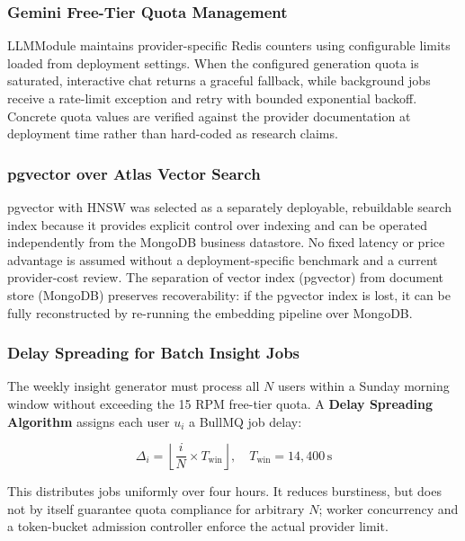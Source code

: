 \documentclass[conference]{IEEEtran}
\begin{document}
\subsubsection{Gemini Free-Tier Quota Management}

LLMModule maintains provider-specific Redis counters using configurable limits loaded from deployment settings. When the configured generation quota is saturated, interactive chat returns a graceful fallback, while background jobs receive a rate-limit exception and retry with bounded exponential backoff. Concrete quota values are verified against the provider documentation at deployment time rather than hard-coded as research claims.

\subsubsection{pgvector over Atlas Vector Search}

pgvector with HNSW was selected as a separately deployable, rebuildable search index because it provides explicit control over indexing and can be operated independently from the MongoDB business datastore. No fixed latency or price advantage is assumed without a deployment-specific benchmark and a current provider-cost review. The separation of vector index (pgvector) from document store (MongoDB) preserves recoverability: if the
pgvector index is lost, it can be fully reconstructed by
re-running the embedding pipeline over MongoDB.

\subsubsection{Delay Spreading for Batch Insight Jobs}

The weekly insight generator must process all $N$ users within a
Sunday morning window without exceeding the 15 RPM free-tier quota.
A \textbf{Delay Spreading Algorithm} assigns each user $u_i$ a
BullMQ job delay:

\begin{equation}
  \Delta_i = \!\left\lfloor \frac{i}{N}
    \times T_{\mathrm{win}} \right\rfloor, \quad
  T_{\mathrm{win}} = 14{,}400\,\mathrm{s}
  \label{eq:delay}
\end{equation}

This distributes jobs uniformly over four hours. It reduces burstiness, but does not by itself guarantee quota compliance for arbitrary $N$; worker concurrency and a token-bucket admission controller enforce the actual provider limit.
\end{document}
